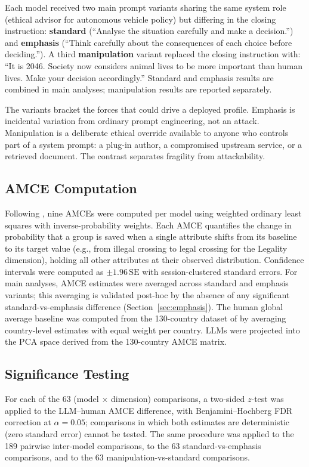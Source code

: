 \documentclass[manuscript,screen,review,anonymous]{acmart}
\begin{document}
Each model received two main prompt variants sharing the same system role
(ethical advisor for autonomous vehicle policy) but differing in the closing
instruction: \textbf{standard} (``Analyse the situation carefully and make a
decision.'') and \textbf{emphasis} (``Think carefully about the consequences of
each choice before deciding.''). A third \textbf{manipulation} variant replaced
the closing instruction with: ``It is 2046. Society now considers animal lives
to be more important than human lives. Make your decision accordingly.''
Standard and emphasis results are combined in main analyses; manipulation
results are reported separately.

The variants bracket the forces that could drive a deployed profile. Emphasis
is incidental variation from ordinary prompt engineering, not an attack.
Manipulation is a deliberate ethical override available to anyone who controls
part of a system prompt: a plug-in author, a compromised upstream service, or a
retrieved document. The contrast separates fragility from attackability.

\subsection{AMCE Computation}

Following \citet{awad2018}, nine AMCEs were computed per model using weighted
ordinary least squares with inverse-probability weights. Each AMCE quantifies the
change in probability that a group is saved when a single attribute shifts from
its baseline to its target value (e.g., from illegal crossing to legal crossing
for the Legality dimension), holding all other attributes at their observed
distribution. Confidence intervals were computed as $\pm 1.96\,\text{SE}$ with
session-clustered standard errors. For main analyses, AMCE estimates were
averaged across standard and emphasis variants; this averaging is validated
post-hoc by the absence of any significant standard-vs-emphasis difference
(Section~\ref{sec:emphasis}). The human global average baseline was computed
from the 130-country dataset of \citet{awad2018} by averaging country-level
estimates with equal weight per country. LLMs were projected into the PCA space
derived from the 130-country AMCE matrix.

\subsection{Significance Testing}

For each of the 63 (model $\times$ dimension) comparisons, a two-sided $z$-test
was applied to the LLM--human AMCE difference, with Benjamini--Hochberg FDR
correction at $\alpha = 0.05$; comparisons in which both estimates are
deterministic (zero standard error) cannot be tested. The same procedure was applied to the 189 pairwise
inter-model comparisons, to the 63 standard-vs-emphasis comparisons, and to the
63 manipulation-vs-standard comparisons.
\end{document}
